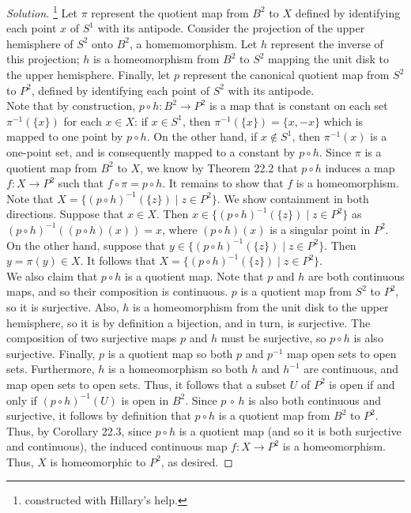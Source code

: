 \documentclass[11pt]{article}
\newenvironment{solution}
  {\renewcommand\qedsymbol{$\blacksquare$}\begin{proof}[Solution]}
  {\end{proof}}
\begin{document}
\begin{solution}\footnote{constructed with Hillary's help.}
Let $\pi$ represent the quotient map from $B^2$ to $X$ defined by identifying each point $x$ of $S^1$ with its antipode. 
Consider the projection of the upper hemisphere of $S^2$ onto $B^2$, a homemomorphism. Let $h$ represent the inverse of this projection; $h$ is a homeomorphism from $B^2$ to $S^2$ mapping the unit disk to the upper hemisphere. 
Finally, let $p$ represent the canonical quotient map from $S^2$ to $P^2$, defined by identifying each point of $S^2$ with its antipode. \\

Note that by construction, $p \circ h \colon B^2 \rightarrow P^2$ is a map that is constant on each set $\pi^{-1}(\{ x \})$ for each $x \in X$: if $x \in S^1$, then $\pi^{-1}(\{ x \}) = \{ x, -x \}$ which is mapped to one point by $p \circ h$.
On the other hand, if $x \notin S^1$, then $\pi^{-1}(x)$ is a one-point set, and is consequently mapped to a constant by $p \circ h$. Since $\pi$ is a quotient map from $B^2$ to $X$, we know by Theorem 22.2 that $p \circ h$ induces a map $f\colon X \rightarrow P^2$ such that $f \circ \pi = p \circ h$. It remains to show that $f$ is a homeomorphism. \\

Note that $X = \{ (p \circ h)^{-1} (\{ z \}) \mid z \in P^2 \}$. We show containment in both directions. 
Suppose that $x \in X$. Then $x \in \{ (p \circ h)^{-1} (\{ z \}) \mid z \in P^2 \}$ as $(p \circ h)^{-1} ((p \circ h)(x)) = x$, where $(p \circ h)(x)$ is a singular point in $P^2$. 
On the other hand, suppose that $y \in \{ (p \circ h)^{-1} (\{ z \}) \mid z \in P^2 \}$. Then $y = \pi(y) \in X$. It follows that $X = \{ (p \circ h)^{-1} (\{ z \}) \mid z \in P^2 \}$. \\

We also claim that $p \circ h$ is a quotient map. Note that $p$ and $h$ are both continuous maps, and so their composition is continuous. 
$p$ is a quotient map from $S^2$ to $P^2$, so it is surjective. Also, $h$ is a homeomorphism from the unit disk to the upper hemisphere, so it is by definition a bijection, and in turn, is surjective. 
The composition of two surjective maps $p$ and $h$ must be surjective, so $p \circ h$ is also surjective. Finally, $p$ is a quotient map so both $p$ and $p^{-1}$ map open sets to open sets. Furthermore, $h$ is a homeomorphism so both $h$ and $h^{-1}$ are continuous, and map open sets to open sets. 
Thus, it follows that a subset $U$ of $P^2$ is open if and only if $(p \circ h)^{-1}(U)$ is open in $B^2$. Since $p \, \circ \, h$ is also both continuous and surjective, it follows
by definition that $p \circ h$ is a quotient map from $B^2$ to $P^2$. \\

Thus, by Corollary 22.3, since $p \circ h$ is a quotient map (and so it is both surjective and continuous), the induced continuous map $f\colon X \rightarrow P^2$ is a homeomorphism. Thus, $X$ is homeomorphic to $P^2$, as desired.
\end{solution}
\end{document}
